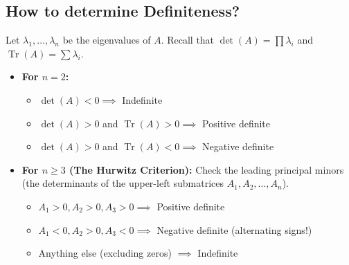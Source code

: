 \subsection*{How to determine Definiteness?}
Let $\lambda_1, \dots, \lambda_n$ be the eigenvalues of $A$. Recall that $\det(A) = \prod \lambda_i$ and $\operatorname{Tr}(A) = \sum \lambda_i$.
\begin{itemize}
    \item \textbf{For $n=2$:} 
        \begin{itemize}
            \item $\det(A) < 0 \implies$ Indefinite
            \item $\det(A) > 0$ and $\operatorname{Tr}(A) > 0 \implies$ Positive definite
            \item $\det(A) > 0$ and $\operatorname{Tr}(A) < 0 \implies$ Negative definite
        \end{itemize}
    \item \textbf{For $n \ge 3$ (The Hurwitz Criterion):} Check the leading principal minors (the determinants of the upper-left submatrices $A_1, A_2, \dots, A_n$).
        \begin{itemize}
            \item $A_1 > 0, A_2 > 0, A_3 > 0 \implies$ Positive definite
            \item $A_1 < 0, A_2 > 0, A_3 < 0 \implies$ Negative definite (alternating signs!)
            \item Anything else (excluding zeros) $\implies$ Indefinite
        \end{itemize}
\end{itemize}

